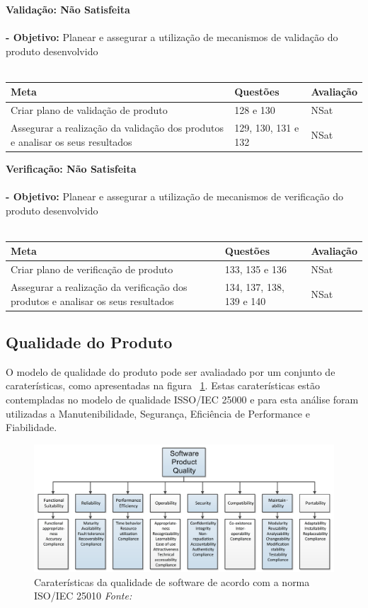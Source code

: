 \documentclass[openany,10pt,a4paper]{article}
\begin{document}
\textbf{Validação: Não Satisfeita} \\  \\
\textbf{- Objetivo:} Planear e assegurar a utilização de mecanismos de validação do produto desenvolvido \\
\\
\begin{tabular}{p{3in}|p{1.5in}|p{1.5in}}		
\textbf{Meta} & \textbf{Questões} & \textbf{Avaliação} \\ \hline
Criar plano de validação de produto & 128 e 130 & NSat \\
Assegurar a realização da validação dos produtos e analisar os seus resultados & 129, 130, 131 e 132 & NSat \\
\end{tabular}

\textbf{Verificação: Não Satisfeita} \\  \\
\textbf{- Objetivo:} Planear e assegurar a utilização de mecanismos de verificação do produto desenvolvido \\
\\
\begin{tabular}{p{3in}|p{1.5in}|p{1.5in}}		
\textbf{Meta} & \textbf{Questões} & \textbf{Avaliação} \\ \hline
Criar plano de verificação de produto & 133, 135 e 136 & NSat \\
Assegurar a realização da verificação dos produtos e analisar os seus resultados & 134, 137, 138, 139 e 140 & NSat \\
\end{tabular}

\subsection{Qualidade do Produto}
O modelo de qualidade do produto pode ser avaliadado por um conjunto de caraterísticas, como apresentadas na figura ~\ref{fig_quality}. Estas caraterísticas estão contempladas no modelo de qualidade ISSO/IEC 25000 e para esta análise foram utilizadas a Manutenibilidade, Segurança, Eficiência de Performance e Fiabilidade. 

\begin{figure}[h]
	\centering
	\includegraphics[width=1\linewidth]{quality.PNG}
	\caption{Caraterísticas da qualidade de software de acordo com a norma ISO/IEC 25010 \small{\textit{Fonte: 	\cite{OMG_Performance}}}}
	\label{fig_quality}
\end{figure}
\end{document}
